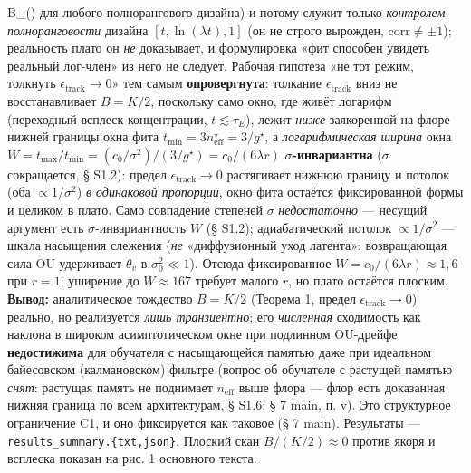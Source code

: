 \documentclass[12pt]{iopart}
\begin{document}
B_{}(\ln)\) для любого полнорангового дизайна) и потому служит только \emph{контролем полноранговости} дизайна \([t,\ln(\lambda t),1]\) (он не строго вырожден, \(\mathrm{corr}\neq\pm1\)); реальность плато он \emph{не} доказывает, и формулировка «фит способен увидеть реальный лог-член» из него не следует. Рабочая гипотеза «не тот режим, толкнуть \(\epsilon_{\text{track}} \to 0\)» тем самым \textbf{опровергнута}: толкание \(\epsilon_{\text{track}}\) вниз не восстанавливает \(B = K/2\), поскольку само окно, где живёт логарифм (переходный всплеск концентрации, \(t \lesssim \tau_E\)), лежит \emph{ниже} заякоренной на флоре нижней границы окна фита \(t_{\min} = 3n_{\text{eff}}^\star = 3/g^\star\), а \emph{логарифмическая ширина} окна \(W = t_{\max}/t_{\min} = (c_0/\sigma^2)/(3/g^\star) = c_0/(6\lambda r)\) \textbf{\(\sigma\)-инвариантна} (\(\sigma\) сокращается, § S1.2): предел \(\epsilon_{\text{track}} \to 0\) растягивает нижнюю границу и потолок (оба \(\propto 1/\sigma^2\)) \emph{в одинаковой пропорции}, окно фита остаётся фиксированной формы и целиком в плато. Само совпадение степеней \(\sigma\) \emph{недостаточно} --- несущий аргумент есть \(\sigma\)-инвариантность \(W\) (§ S1.2); адиабатический потолок \(\propto 1/\sigma^2\) --- шкала насыщения слежения (\emph{не} «диффузионный уход латента»: возвращающая сила OU удерживает \(\theta_v\) в \(\sigma_0^2 \ll 1\)). Отсюда фиксированное \(W = c_0/(6\lambda r) \approx 1{,}6\) при \(r = 1\); уширение до \(W \approx 167\) требует малого \(r\), но плато остаётся плоским. \textbf{Вывод:} аналитическое тождество \(B = K/2\) (Теорема 1, предел \(\epsilon_{\text{track}} \to 0\)) реально, но реализуется \emph{лишь транзиентно}; его \emph{численная} сходимость как наклона в широком асимптотическом окне при подлинном OU-дрейфе \textbf{недостижима} для обучателя с насыщающейся памятью даже при идеальном байесовском (калмановском) фильтре (вопрос об обучателе с растущей памятью \emph{снят}: растущая память не поднимает \(n_{\text{eff}}\) выше флора --- флор есть доказанная нижняя граница по всем архитектурам, § S1.6; § 7 main, п. v). Это структурное ограничение C1, и оно фиксируется как таковое (§ 7 main). Результаты --- \texttt{results\_summary.\{txt,json\}}. Плоский скан \(B/(K/2)\approx0\) против якоря и всплеска показан на рис. 1 основного текста.
\end{document}
